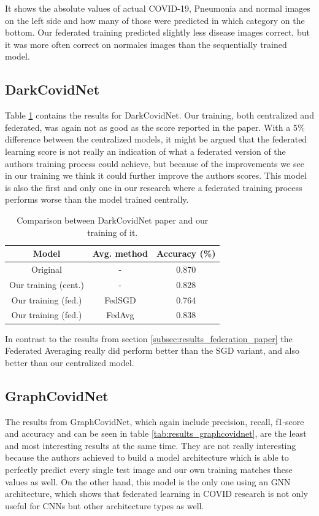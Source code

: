 It shows the absolute values of actual COVID-19, Pneumonia and normal images on the left side and how many of those were predicted in which category on the bottom. Our federated training predicted slightly less disease images correct, but it was more often correct on normales images than the sequentially trained model.

\subsection{DarkCovidNet}
Table \ref{tab:results_darkcovidnet} contains the results for DarkCovidNet. Our training, both centralized and federated, was again not as good as the score reported in the paper. With a 5\% difference between the centralized models, it might be argued that the federated learning score is not really an indication of what a federated version of the authors training process could achieve, but because of the improvements we see in our training we think it could further improve the authors scores. This model is also the first and only one in our research where a federated training process performs worse than the model trained centrally.

\begin{table}[htbp]
    \small
    \centering
    \caption{Comparison between DarkCovidNet paper\cite{dark_net} and our training of it.}
    \begin{tabular}{c|c|c}
        Model & Avg. method & Accuracy (\%)\\
        \hline
        Original & - & 0.870 \\
        Our training (cent.) & - & 0.828\\
        Our training (fed.) & FedSGD & 0.764 \\
        Our training (fed.) & FedAvg & 0.838 \\
    \end{tabular}
    \label{tab:results_darkcovidnet}
\end{table}

In contrast to the results from section \ref{subsec:results_federation_paper} the Federated Averaging really did perform better than the SGD variant, and also better than our centralized model.

\subsection{GraphCovidNet}
The results from GraphCovidNet, which again include precision, recall, f1-score and accuracy and can be seen in table \ref{tab:results_graphcovidnet}, are the least and most interesting results at the same time. They are not really interesting because the authors achieved to build a model architecture which is able to perfectly predict every single test image and our own training matches these values as well. On the other hand, this model is the only one using an GNN architecture, which shows that federated learning in COVID research is not only useful for CNNs but other architecture types as well.

